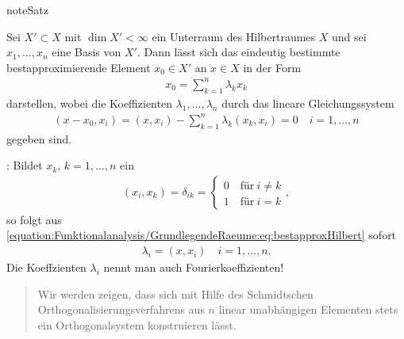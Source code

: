 \documentclass[letterpaper,10pt,english]{jupyterBook}
\begin{document}
\begin{sphinxadmonition}{note}{Satz}

Sei \(X'\subset X\) mit \(\dim X' < \infty\) ein Unterraum des Hilbertraumes \(X\) und sei \(x_1, \ldots, x_n\) eine Basis von \(X'\). Dann lässt sich das eindeutig bestimmte bestapproximierende Element \(x_0\in X'\) an \(x\in X\) in der Form
\begin{equation*}
\begin{split}x_0 = \sum_{k=1}^n \lambda_k x_k\end{split}
\end{equation*}
darstellen, wobei die Koeffizienten \(\lambda_1, \ldots, \lambda_n\) durch das lineare Gleichungssystem
\begin{equation}\label{equation:Funktionalanalysis/GrundlegendeRaeume:eq:bestapproxHilbert}
\begin{split}(x-x_0,x_i) = (x,x_i) - \sum_{k=1}^n \lambda_k (x_k,x_i) = 0 \quad i = 1, \ldots, n\end{split}
\end{equation}
gegeben sind.
\end{sphinxadmonition}

: Bildet \(x_k\), \(k=1,\ldots, n\) ein 
\begin{equation*}
\begin{split}(x_i,x_k) = \delta_{i k} = \begin{cases}
0\quad \text{für}\ i\not= k\\
1\quad \text{für}\ i = k\end{cases},\end{split}
\end{equation*}
so folgt aus \eqref{equation:Funktionalanalysis/GrundlegendeRaeume:eq:bestapproxHilbert} sofort
\begin{equation*}
\begin{split}\lambda_i = (x,x_i)\quad i = 1, \ldots,n.\end{split}
\end{equation*}
Die Koeffzienten \(\lambda_i\) nennt man auch Fourierkoeffizienten!
\begin{quote}

Wir werden zeigen, dass sich mit Hilfe des Schmidtschen Orthogonalisierungsverfahrens aus \(n\) linear unabhängigen Elementen stets ein Orthogonalsystem konstruieren lässt.
\end{quote}
\end{document}
